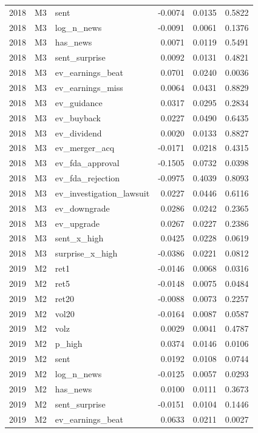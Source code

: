 \begin{tabular}{rllrrr}
2018 & M3 & sent & -0.0074 & 0.0135 & 0.5822 \\
2018 & M3 & log\_n\_news & -0.0091 & 0.0061 & 0.1376 \\
2018 & M3 & has\_news & 0.0071 & 0.0119 & 0.5491 \\
2018 & M3 & sent\_surprise & 0.0092 & 0.0131 & 0.4821 \\
2018 & M3 & ev\_earnings\_beat & 0.0701 & 0.0240 & 0.0036 \\
2018 & M3 & ev\_earnings\_miss & 0.0064 & 0.0431 & 0.8829 \\
2018 & M3 & ev\_guidance & 0.0317 & 0.0295 & 0.2834 \\
2018 & M3 & ev\_buyback & 0.0227 & 0.0490 & 0.6435 \\
2018 & M3 & ev\_dividend & 0.0020 & 0.0133 & 0.8827 \\
2018 & M3 & ev\_merger\_acq & -0.0171 & 0.0218 & 0.4315 \\
2018 & M3 & ev\_fda\_approval & -0.1505 & 0.0732 & 0.0398 \\
2018 & M3 & ev\_fda\_rejection & -0.0975 & 0.4039 & 0.8093 \\
2018 & M3 & ev\_investigation\_lawsuit & 0.0227 & 0.0446 & 0.6116 \\
2018 & M3 & ev\_downgrade & 0.0286 & 0.0242 & 0.2365 \\
2018 & M3 & ev\_upgrade & 0.0267 & 0.0227 & 0.2386 \\
2018 & M3 & sent\_x\_high & 0.0425 & 0.0228 & 0.0619 \\
2018 & M3 & surprise\_x\_high & -0.0386 & 0.0221 & 0.0812 \\
2019 & M2 & ret1 & -0.0146 & 0.0068 & 0.0316 \\
2019 & M2 & ret5 & -0.0148 & 0.0075 & 0.0484 \\
2019 & M2 & ret20 & -0.0088 & 0.0073 & 0.2257 \\
2019 & M2 & vol20 & -0.0164 & 0.0087 & 0.0587 \\
2019 & M2 & volz & 0.0029 & 0.0041 & 0.4787 \\
2019 & M2 & p\_high & 0.0374 & 0.0146 & 0.0106 \\
2019 & M2 & sent & 0.0192 & 0.0108 & 0.0744 \\
2019 & M2 & log\_n\_news & -0.0125 & 0.0057 & 0.0293 \\
2019 & M2 & has\_news & 0.0100 & 0.0111 & 0.3673 \\
2019 & M2 & sent\_surprise & -0.0151 & 0.0104 & 0.1446 \\
2019 & M2 & ev\_earnings\_beat & 0.0633 & 0.0211 & 0.0027 \\

\end{tabular}
